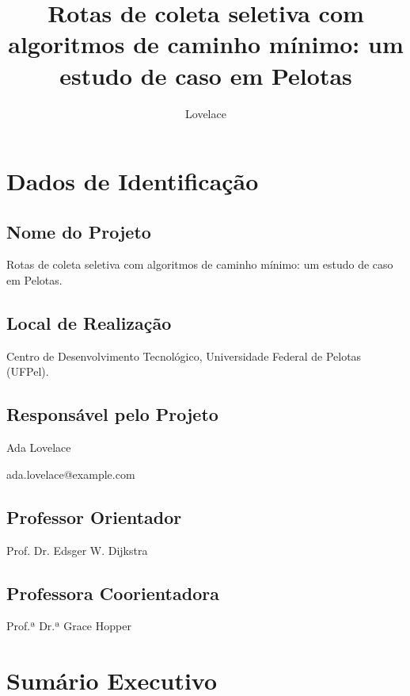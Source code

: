 \documentclass[tcc-proposta]{texufpel}
\title{Rotas de coleta seletiva com algoritmos de caminho mínimo: um estudo de caso em Pelotas}
\author{Lovelace}{Ada}                          %
\begin{document}
\renewcommand{\coadvisorname}{Coorientadora}

\maketitle   %
\sloppy      %

\chapter{Dados de Identificação}

\section{Nome do Projeto}
Rotas de coleta seletiva com algoritmos de caminho mínimo: um estudo de caso em
Pelotas.

\section{Local de Realização}
Centro de Desenvolvimento Tecnológico, Universidade Federal de Pelotas (UFPel).

\section{Responsável pelo Projeto}
Ada Lovelace

ada.lovelace@example.com %

\section{Professor Orientador}
Prof. Dr. Edsger W. Dijkstra

\section{Professora Coorientadora}
Prof.ª Dr.ª Grace Hopper

\chapter{Sumário Executivo}
\end{document}
